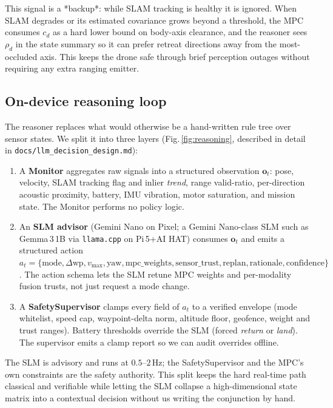 This signal is a *backup*: while SLAM tracking is healthy it is
ignored. When SLAM degrades or its estimated covariance grows beyond a
threshold, the MPC consumes $c_d$ as a hard lower bound on body-axis
clearance, and the reasoner sees $\rho_d$ in the state summary so it
can prefer retreat directions away from the most-occluded axis. This
keeps the drone safe through brief perception outages without
requiring any extra ranging emitter.

\subsection{On-device reasoning loop}
\label{sec:reasoning}
The reasoner replaces what would otherwise be a hand-written rule tree
over sensor states. We split it into three layers (Fig.\,\ref{fig:reasoning},
described in detail in \texttt{docs/llm\_decision\_design.md}):

\begin{enumerate}
\item A \textbf{Monitor} aggregates raw signals into a structured
  observation $\mathbf{o}_t$: pose, velocity, SLAM tracking flag and
  inlier \emph{trend}, range valid-ratio, per-direction acoustic
  proximity, battery, IMU vibration, motor saturation, and mission
  state. The Monitor performs no policy logic.
\item An \textbf{SLM advisor} (Gemini Nano on Pixel; a Gemini
  Nano-class SLM such as Gemma\,3\,1B via \texttt{llama.cpp} on
  Pi\,5+AI HAT) consumes $\mathbf{o}_t$ and emits a structured
  action $a_t = \{\text{mode}, \Delta\text{wp}, v_{\max},
  \text{yaw}, \text{mpc\_weights}, \text{sensor\_trust},
  \text{replan}, \text{rationale}, \text{confidence}\}$. The action
  schema lets the SLM retune MPC weights and per-modality fusion
  trusts, not just request a mode change.
\item A \textbf{SafetySupervisor} clamps every field of $a_t$ to a
  verified envelope (mode whitelist, speed cap, waypoint-delta norm,
  altitude floor, geofence, weight and trust ranges). Battery
  thresholds override the SLM (forced \emph{return} or \emph{land}).
  The supervisor emits a clamp report so we can audit overrides
  offline.
\end{enumerate}

The SLM is advisory and runs at $0.5$--$2$\,Hz; the SafetySupervisor
and the MPC's own constraints are the safety authority. This split
keeps the hard real-time path classical and verifiable while letting
the SLM collapse a high-dimensional state matrix into a contextual
decision without us writing the conjunction by hand.

